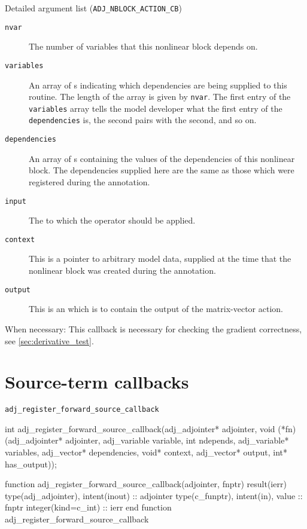 \begin{boxwithtitle}{Detailed argument list (\texttt{ADJ_NBLOCK_ACTION_CB})}
\begin{description}
\item[\texttt{nvar}] The number of variables that this nonlinear block depends on.
\item[\texttt{variables}] An array of s indicating which dependencies are being supplied to this routine. The length of the
array is given by \texttt{nvar}. The first entry of the \texttt{variables} array
tells the model developer what the first entry of the \texttt{dependencies} is, the second pairs with the second, and so on.
\item[\texttt{dependencies}] An array of s containing the values of the dependencies of this nonlinear block. The dependencies supplied
here are the same as those which were registered during the annotation.
\item[\texttt{input}] The  to which the operator should be applied.
\item[\texttt{context}] This is a pointer to arbitrary model data, supplied at the time that the nonlinear block was created during the annotation.
\item[\texttt{output}] This is an  which is to contain the output of the matrix-vector action.
\end{description}
\end{boxwithtitle}

When necessary: 
This callback is necessary for checking the gradient correctness, see \autoref{sec:derivative_test}.

\section{Source-term callbacks}
\begin{boxwithtitle}{\texttt{adj_register_forward_source_callback}}
\begin{minipage}{\columnwidth}
\begin{ccode}
int adj_register_forward_source_callback(adj_adjointer* adjointer, 
                 void (*fn)(adj_adjointer* adjointer, adj_variable variable, 
                            int ndepends, adj_variable* variables, 
                            adj_vector* dependencies, void* context, 
                            adj_vector* output, int* has_output));
\end{ccode}
\begin{fortrancode}
function adj_register_forward_source_callback(adjointer, fnptr) 
                                                   result(ierr) 
  type(adj_adjointer), intent(inout) :: adjointer
  type(c_funptr), intent(in), value :: fnptr
  integer(kind=c_int) :: ierr
end function adj_register_forward_source_callback
\end{fortrancode}
\end{minipage}
\end{boxwithtitle}

